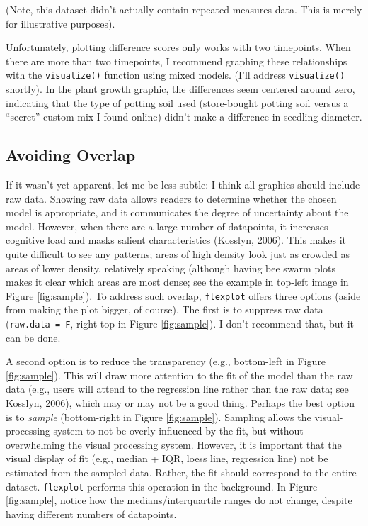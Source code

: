 \documentclass[
  man]{apa6}
\begin{document}
\normalsize

\noindent (Note, this dataset didn't actually contain repeated measures data. This is merely for illustrative purposes).

Unfortunately, plotting difference scores only works with two timepoints. When there are more than two timepoints, I recommend graphing these relationships with the \texttt{visualize()} function using mixed models. (I'll address \texttt{visualize()} shortly). In the plant growth graphic, the differences seem centered around zero, indicating that the type of potting soil used (store-bought potting soil versus a ``secret'' custom mix I found online) didn't make a difference in seedling diameter.

\hypertarget{avoiding-overlap}{%
\subsection{Avoiding Overlap}\label{avoiding-overlap}}

If it wasn't yet apparent, let me be less subtle: I think all graphics should include raw data. Showing raw data allows readers to determine whether the chosen model is appropriate, and it communicates the degree of uncertainty about the model. However, when there are a large number of datapoints, it increases cognitive load and masks salient characteristics (Kosslyn, 2006). This makes it quite difficult to see any patterns; areas of high density look just as crowded as areas of lower density, relatively speaking (although having bee swarm plots makes it clear which areas are most dense; see the example in top-left image in Figure \ref{fig:sample}). To address such overlap, \texttt{flexplot} offers three options (aside from making the plot bigger, of course). The first is to suppress raw data (\texttt{raw.data\ =\ F}, right-top in Figure \ref{fig:sample}). I don't recommend that, but it can be done.

A second option is to reduce the transparency (e.g., bottom-left in Figure \ref{fig:sample}). This will draw more attention to the fit of the model than the raw data (e.g., users will attend to the regression line rather than the raw data; see Kosslyn, 2006), which may or may not be a good thing. Perhaps the best option is to \emph{sample} (bottom-right in Figure \ref{fig:sample}). Sampling allows the visual-processing system to not be overly influenced by the fit, but without overwhelming the visual processing system. However, it is important that the visual display of fit (e.g., median + IQR, loess line, regression line) not be estimated from the sampled data. Rather, the fit should correspond to the entire dataset. \texttt{flexplot} performs this operation in the background. In Figure \ref{fig:sample}, notice how the medians/interquartile ranges do not change, despite having different numbers of datapoints.
\end{document}
